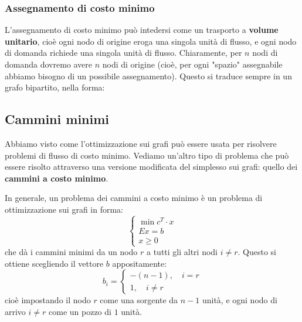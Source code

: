 \documentclass[a4paper,11pt]{article}
\begin{document}
\subsubsection{Assegnamento di costo minimo}
L'assegnamento di costo minimo può intedersi come un trasporto a \textbf{volume unitario}, cioè ogni nodo di origine eroga una singola unità di flusso, e ogni nodo di domanda richiede una singola unità di flusso.
Chiaramente, per $n$ nodi di domanda dovremo avere $n$ nodi di origine (cioè, per ogni "spazio" assegnabile abbiamo bisogno di un possibile assegnamento).
Questo si traduce sempre in un grafo bipartito, nella forma:
\begin{center}
\end{center}

\subsection{Cammini minimi}
Abbiamo visto come l'ottimizzazione sui grafi può essere usata per risolvere problemi di flusso di costo minimo.
Vediamo un'altro tipo di problema che può essere risolto attraverso una versione modificata del simplesso sui grafi: quello dei \textbf{cammini a costo minimo}.

In generale, un problema dei cammini a costo minimo è un problema di ottimizzazione sui grafi in forma:
\[
	\begin{cases}
		\min c^T \cdot x \\
		Ex = b \\ 
		x \geq 0
	\end{cases}
\]
che dà i cammini minimi da un nodo $r$ a tutti gli altri nodi $i \neq r$.
Questo si ottiene scegliendo il vettore $b$ appositamente:
\[
	b_i =
	\begin{cases}
		-(n - 1), \quad i = r \\ 
		1, \quad i \neq r
	\end{cases}
\]
cioè impostando il nodo $r$ come una sorgente da $n-1$ unità, e ogni nodo di arrivo $i \neq r$ come un pozzo di $1$ unità.
\end{document}

